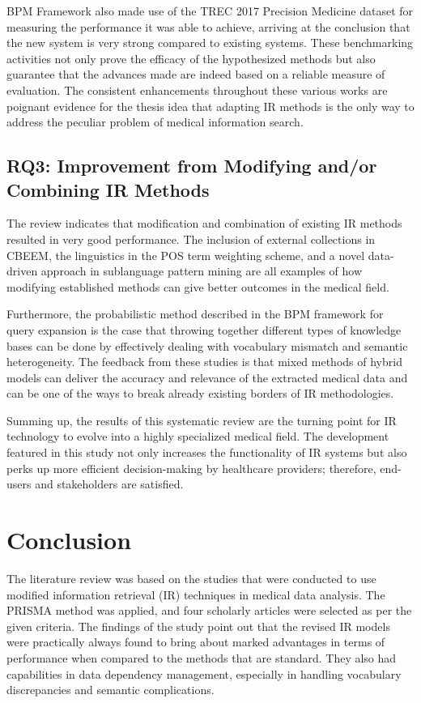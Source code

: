 \documentclass[conference]{IEEEtran}
\begin{document}
BPM Framework also made use of the TREC 2017 Precision Medicine dataset for measuring the performance it was able to achieve, arriving at the conclusion that the new system is very strong compared to existing systems. These benchmarking activities not only prove the efficacy of the hypothesized methods but also guarantee that the advances made are indeed based on a reliable measure of evaluation. The consistent enhancements throughout these various works are poignant evidence for the thesis idea that adapting IR methods is the only way to address the peculiar problem of medical information search.

\subsection{RQ3: Improvement from Modifying and/or Combining IR Methods}

The review indicates that modification and combination of existing IR methods resulted in very good performance. The inclusion of external collections in CBEEM, the linguistics in the POS term weighting scheme, and a novel data-driven approach in sublanguage pattern mining are all examples of how modifying established methods can give better outcomes in the medical field.

Furthermore, the probabilistic method described in the BPM framework for query expansion is the case that throwing together different types of knowledge bases can be done by effectively dealing with vocabulary mismatch and semantic heterogeneity. The feedback from these studies is that mixed methods of hybrid models can deliver the accuracy and relevance of the extracted medical data and can be one of the ways to break already existing borders of IR methodologies.

Summing up, the results of this systematic review are the turning point for IR technology to evolve into a highly specialized medical field. The development featured in this study not only increases the functionality of IR systems but also perks up more efficient decision-making by healthcare providers; therefore, end-users and stakeholders are satisfied.

\section{Conclusion}

The literature review was based on the studies that were conducted to use modified information retrieval (IR) techniques in medical data analysis. The PRISMA method was applied, and four scholarly articles were selected as per the given criteria. The findings of the study point out that the revised IR models were practically always found to bring about marked advantages in terms of performance when compared to the methods that are standard. They also had capabilities in data dependency management, especially in handling vocabulary discrepancies and semantic complications.
\end{document}
